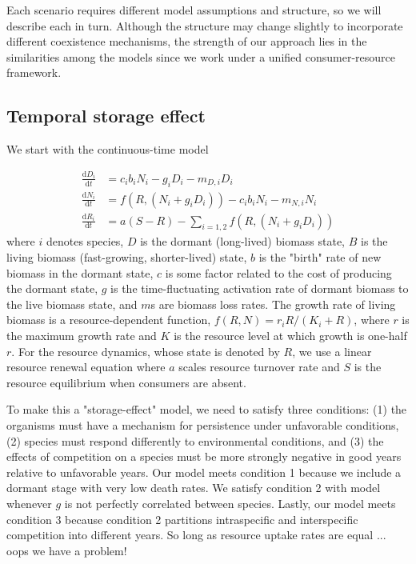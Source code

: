 \documentclass[12pt]{article}
\begin{document}
Each scenario requires different model assumptions and structure, so we will describe each in turn. Although the structure may change slightly to incorporate different coexistence mechanisms, the strength of our approach lies in the similarities among the models since we work under a unified consumer-resource framework.

\subsection{Temporal storage effect}
We start with the continuous-time model

\begin{align}
\frac{\text{d}D_{i}}{\text{d}t} &= c_{i}b_{i}N_{i} - g_{i}D_{i} - m_{D,i}D_{i}\\
\frac{\text{d}N_{i}}{\text{d}t} &= f(R,(N_{i}+g_{i}D_{i})) - c_{i}b_{i}N_{i} - m_{N,i}N_{i}\\
\frac{\text{d}R_{i}}{\text{d}t} &= a(S - R) - \sum\limits_{i=1,2}f(R,(N_{i}+g_{i}D_{i}))
\end{align}
where $i$ denotes species, $D$ is the dormant (long-lived) biomass state, $B$ is the living biomass (fast-growing, shorter-lived) state, $b$ is the "birth" rate of new biomass in the dormant state, $c$ is some factor related to the cost of producing the dormant state, $g$ is the time-fluctuating activation rate of dormant biomass to the live biomass state, and $m$s are biomass loss rates. The growth rate of living biomass is a resource-dependent function, $f(R,N) = r_{i}R/(K_{i}+R)$, where $r$ is the maximum growth rate and $K$ is the resource level at which growth is one-half $r$. For the resource dynamics, whose state is denoted by $R$, we use a linear resource renewal equation where $a$ scales resource turnover rate and $S$ is the resource equilibrium when consumers are absent.

To make this a "storage-effect" model, we need to satisfy three conditions: (1) the organisms must have a mechanism for persistence under unfavorable conditions, (2) species must respond differently to environmental conditions, and (3) the effects of competition on a species must be more strongly negative in good years relative to unfavorable years. Our model meets condition 1 because we include a dormant stage with very low death rates. We satisfy condition 2 with model whenever $g$ is not perfectly correlated between species. Lastly, our model meets condition 3 because condition 2 partitions intraspecific and interspecific competition into different years. So long as resource uptake rates are equal ... oops we have a problem!  
\end{document}

